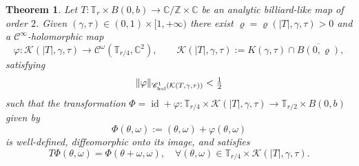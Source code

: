 \documentclass[10pt]{article}
\newtheorem{theorem}{Theorem}[section]
\DeclareMathOperator{\id}{id}
\newcommand{\Z}{\mathbb{Z}}
\newcommand{\C}{\mathbb{C}}
\newcommand{\T}{\mathbb{T}}
\newcommand{\Function}[5]{\begin{array}{cccc} #1 : & #2 & \rightarrow & #3 \\ & #4 & \mapsto & #5 \end{array}}
\begin{document}
\begin{theorem}
\label{thm:main_rough_formulation}
Let $T: \T_r \times B(0, b) \to \C/\Z \times \C$ be an analytic billiard-like map of order $2$. Given $(\gamma,\tau)\in(0,1)\times[1,+\infty)$ there exist $\varrho=\varrho(|T|, \gamma,\tau)>0$ and a $\mathscr{C}^\infty$-holomorphic map 
\[
{\varphi}:
\mathcal K(|T|, \gamma, \tau) \rightarrow \mathscr C^\omega(\T_{r/4}, \C^2), \qquad 
\mathcal K(|T|, \gamma, \tau):= K(\gamma, \tau)\cap \overline{B(0, \varrho)},\]
satisfying 
\[
 \| {\varphi}\|_{\mathscr C^1_{\textup{hol}}(\mathcal K(T, \gamma, \tau))} < \tfrac{1}{2}
\]
such that the transformation $\Phi=\id + {\varphi}: \T_{r/4} \times \mathcal K(|T|, \gamma, \tau) \to \T_{r/2} \times B(0, b)$ given by
 \begin{equation}
 \label{eq:KAM_curve_conjugacy}
  \Phi(\theta, \omega) := (\theta, \omega) + {\varphi}(\theta, \omega)
 \end{equation}
is well-defined, diffeomorphic onto its image, and satisfies
\begin{equation}
\label{eq:KAM_curve_equation}
    T\Phi(\theta, \omega) = \Phi(\theta + \omega, \omega),
\quad \forall (\theta, \omega)\in\T_{r/4}\times \mathcal K(|T|, \gamma, \tau).
\end{equation}

\end{theorem}
\end{document}
